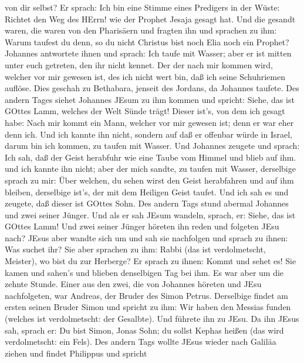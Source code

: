 von dir selbst?  Er sprach: Ich bin eine Stimme eines
Predigers in der Wüste: Richtet den Weg des HErrn! wie der Prophet
Jesaja gesagt hat.  Und die gesandt waren, die waren von
den Pharisäern  und fragten ihn und sprachen zu ihm: Warum
taufest du denn, so du nicht Christus bist noch Elia noch ein Prophet?
 Johannes antwortete ihnen und sprach: Ich taufe mit
Wasser; aber er ist mitten unter euch getreten, den ihr nicht kennet.
 Der der nach mir kommen wird, welcher vor mir gewesen ist,
des ich nicht wert bin, daß ich seine Schuhriemen auflöse. 
Dies geschah zu Bethabara, jenseit des Jordans, da Johannes taufete.
 Des andern Tages siehet Johannes JEsum zu ihm kommen und
spricht: Siehe, das ist GOttes Lamm, welches der Welt Sünde trägt!
 Dieser ist's, von dem ich gesagt habe: Nach mir kommt ein
Mann, welcher vor mir gewesen ist; denn er war eher denn ich.
 Und ich kannte ihn nicht, sondern auf daß er offenbar
würde in Israel, darum bin ich kommen, zu taufen mit Wasser.
 Und Johannes zeugete und sprach: Ich sah, daß der Geist
herabfuhr wie eine Taube vom Himmel und blieb auf ihm.  und
ich kannte ihn nicht; aber der mich sandte, zu taufen mit Wasser,
derselbige sprach zu mir: Über welchen, du sehen wirst den Geist
herabfahren und auf ihm bleiben, derselbige ist's, der mit dem Heiligen
Geist taufet.  Und ich sah es und zeugete, daß dieser ist
GOttes Sohn.  Des andern Tags stund abermal Johannes und
zwei seiner Jünger.  Und als er sah JEsum wandeln, sprach,
er: Siehe, das ist GOttes Lamm!  Und zwei seiner Jünger
höreten ihn reden und folgeten JEsu nach?  JEsus aber
wandte sich um und sah sie nachfolgen und sprach zu ihnen: Was suchet
ihr? Sie aber sprachen zu ihm: Rabbi (das ist verdolmetscht, Meister),
wo bist du zur Herberge?  Er sprach zu ihnen: Kommt und
sehet es! Sie kamen und sahen's und blieben denselbigen Tag bei ihm. Es
war aber um die zehnte Stunde.  Einer aus den zwei, die von
Johannes höreten und JEsu nachfolgeten, war Andreas, der Bruder des
Simon Petrus.  Derselbige findet am ersten seinen Bruder
Simon und spricht zu ihm: Wir haben den Messias funden (welches ist
verdolmetscht: der Gesalbte).  Und führete ihn zu JEsu. Da
ihn JEsus sah, sprach er: Du bist Simon, Jonas Sohn; du sollst Kephas
heißen (das wird verdolmetscht: ein Fels).  Des andern Tags
wollte JEsus wieder nach Galiläa ziehen und findet Philippus und spricht
